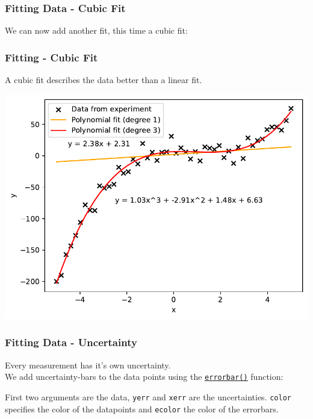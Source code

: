 \documentclass{beamer}
\newcommand{\hrefu}[2]{\underline{\href{#1}{#2}}}
\begin{document}
\begin{frame}
  \frametitle{Fitting Data - Cubic Fit}
  We can now add another fit, this time a cubic fit:
  
  
\end{frame}

\begin{frame}
  \frametitle{Fitting - Cubic Fit}
  \begin{minipage}[t]{0.25\textwidth}
    \vspace{-5.0cm}
    A cubic fit describes the data better than a linear fit.
\end{minipage}
\hfill
\begin{minipage}[t]{0.72\textwidth}
    \centering
    \includegraphics[width=\linewidth]{fig/fitting3.pdf}
\end{minipage}
\end{frame}

\begin{frame}
  \frametitle{Fitting Data - Uncertainty}
  Every measurement has it's own uncertainty.\\ We add uncertainty-bars to the data points using the \hrefu{https://matplotlib.org/stable/api/_as_gen/matplotlib.pyplot.errorbar.html}{\texttt{errorbar()}} function:
  
  First two arguments are the data, \texttt{yerr} and \texttt{xerr} are the uncertainties. \texttt{color} specifies the color of the datapoints and \texttt{ecolor} the color of the errorbars.
\end{frame}
\end{document}

